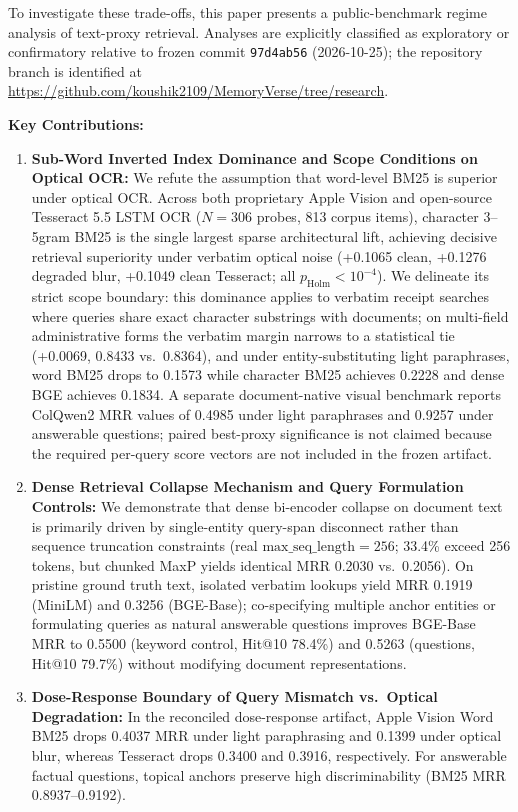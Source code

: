 \documentclass[conference]{IEEEtran}
\begin{document}
To investigate these trade-offs, this paper presents a public-benchmark regime analysis of text-proxy retrieval. Analyses are explicitly classified as exploratory or confirmatory relative to frozen commit \texttt{97d4ab56} (2026-10-25); the repository branch is identified at \url{https://github.com/koushik2109/MemoryVerse/tree/research}.

\textbf{Key Contributions:}
\begin{enumerate}
    \setlength{\itemsep}{1pt plus 0.5pt}
    \setlength{\parskip}{0pt}
    \item \textbf{Sub-Word Inverted Index Dominance and Scope Conditions on Optical OCR:} We refute the assumption that word-level BM25 is superior under optical OCR. Across both proprietary Apple Vision and open-source Tesseract 5.5 LSTM OCR ($N=306$ probes, 813 corpus items), character 3--5gram BM25 is the single largest sparse architectural lift, achieving decisive retrieval superiority under verbatim optical noise (+0.1065 clean, +0.1276 degraded blur, +0.1049 clean Tesseract; all $p_{\text{Holm}} < 10^{-4}$). We delineate its strict scope boundary: this dominance applies to verbatim receipt searches where queries share exact character substrings with documents; on multi-field administrative forms the verbatim margin narrows to a statistical tie (+0.0069, 0.8433 vs.\ 0.8364), and under entity-substituting light paraphrases, word BM25 drops to 0.1573 while character BM25 achieves 0.2228 and dense BGE achieves 0.1834. A separate document-native visual benchmark reports ColQwen2 MRR values of 0.4985 under light paraphrases and 0.9257 under answerable questions; paired best-proxy significance is not claimed because the required per-query score vectors are not included in the frozen artifact.
    \item \textbf{Dense Retrieval Collapse Mechanism and Query Formulation Controls:} We demonstrate that dense bi-encoder collapse on document text is primarily driven by single-entity query-span disconnect rather than sequence truncation constraints (real $\text{max\_seq\_length}=256$; 33.4\% exceed 256 tokens, but chunked MaxP yields identical MRR 0.2030 vs.\ 0.2056). On pristine ground truth text, isolated verbatim lookups yield MRR 0.1919 (MiniLM) and 0.3256 (BGE-Base); co-specifying multiple anchor entities or formulating queries as natural answerable questions improves BGE-Base MRR to 0.5500 (keyword control, Hit@10 78.4\%) and 0.5263 (questions, Hit@10 79.7\%) without modifying document representations.
    \item \textbf{Dose-Response Boundary of Query Mismatch vs.\ Optical Degradation:} In the reconciled dose-response artifact, Apple Vision Word BM25 drops 0.4037 MRR under light paraphrasing and 0.1399 under optical blur, whereas Tesseract drops 0.3400 and 0.3916, respectively. For answerable factual questions, topical anchors preserve high discriminability (BM25 MRR 0.8937--0.9192).

\end{enumerate}
\end{document}
